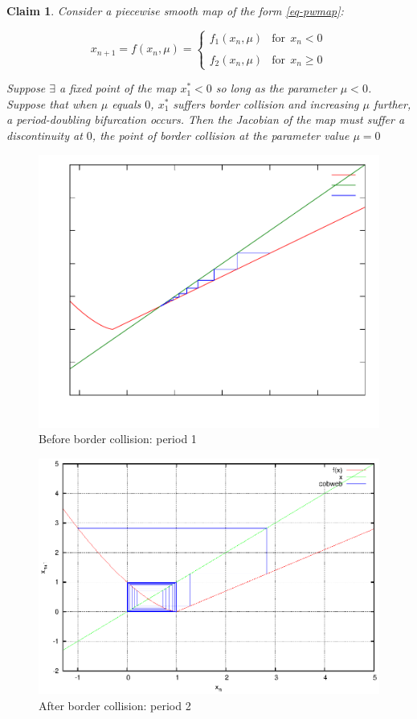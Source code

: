 \documentclass{book}
\renewcommand{\(}{\begin{columns}}
\renewcommand{\)}{\end{columns}}
\newcommand{\<}[1]{\begin{column}{#1}}
\renewcommand{\>}{\end{column}}
\newtheorem{claim}{Claim}[section]
\begin{document}
\begin{claim}
\label{claim-jacob-disc}
Consider a piecewise smooth map of the form \eqref{eq-pwmap}:

\begin{equation}
x_{n+1}=f(x_n,\mu)=\begin{cases} f_1(x_n,\mu) & \mathrm{for}~~ x_n < 0 \\ \\
f_2(x_n,\mu)&\mathrm{for}~~ x_n\geq 0 \end{cases}
\end{equation}

Suppose $\exists$ a fixed point of the map $x_1^*<0$ so long as  the parameter $\mu<0$.  
Suppose that when $\mu$ equals $0$, $x_1^*$ suffers border collision and 
increasing $\mu$ further, a period-doubling bifurcation occurs.  Then the Jacobian 
of the map must suffer a discontinuity at $0$, the point of border collision 
at the parameter value $\mu=0$
\end{claim}

\begin{figure}
\caption{Before border collision: period 1}
\begin{center}
\includegraphics[width=0.7\columnwidth]{pw-perdoub-bef}
\end{center}
\end{figure}

\begin{figure}
\caption{After border collision: period 2}
\begin{center}
\includegraphics[width=0.7\columnwidth]{pw-perdoub-after}
\end{center}
\end{figure}
\end{document}
